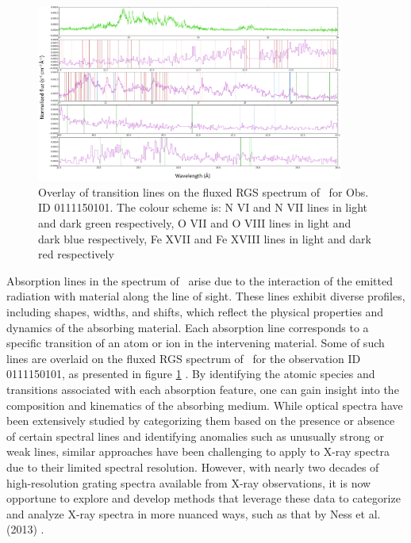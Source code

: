     \begin{figure}[!htb]
    	\centering
    	\includegraphics[width=0.9\textwidth]{figures/fig-line_identification-rgs.png}
    	\caption{Overlay of transition lines on the fluxed RGS spectrum of \source\ for Obs. ID 0111150101. The colour scheme is: N VI and N VII lines in light and dark green respectively, O VII and O VIII lines in light and dark blue respectively, Fe XVII and Fe XVIII lines in light and dark red respectively}
    	\label{fig:rgs-line-overlay}  
    \end{figure}
    
    Absorption lines in the spectrum of \source\ arise due to the interaction of the emitted radiation with material along the line of sight. These lines exhibit diverse profiles, including shapes, widths, and shifts, which reflect the physical properties and dynamics of the absorbing material. Each absorption line corresponds to a specific transition of an atom or ion in the intervening material. Some of such lines are overlaid on the fluxed RGS spectrum of \source\ for the observation ID 0111150101, as presented in figure \ref{fig:rgs-line-overlay} \cite{bhattacharya2020python}. By identifying the atomic species and transitions associated with each absorption feature, one can gain insight into the composition and kinematics of the absorbing medium. While optical spectra have been extensively studied by categorizing them based on the presence or absence of certain spectral lines and identifying anomalies such as unusually strong or weak lines, similar approaches have been challenging to apply to X-ray spectra due to their limited spectral resolution. However, with nearly two decades of high-resolution grating spectra available from X-ray observations, it is now opportune to explore and develop methods that leverage these data to categorize and analyze X-ray spectra in more nuanced ways, such as that by Ness et al. (2013) \cite{ness2013obscuration}.
    
